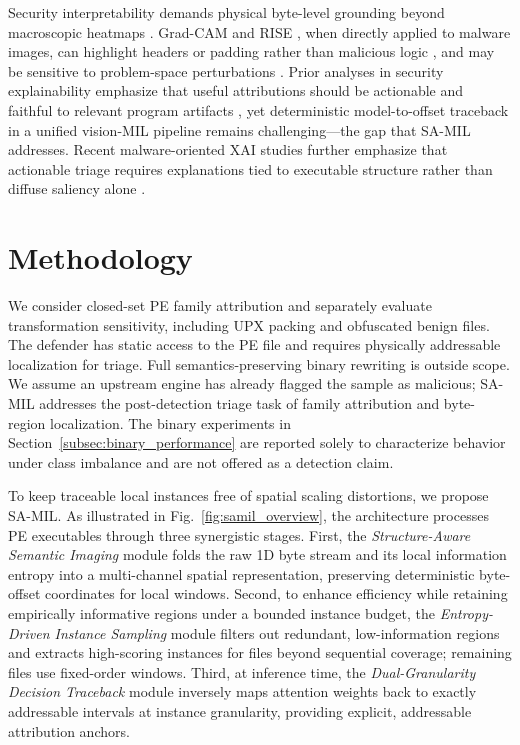 \documentclass[runningheads]{llncs}
\begin{document}
Security interpretability demands physical byte-level grounding beyond macroscopic heatmaps \cite{nadeem2023sok}. Grad-CAM \cite{selvaraju2017grad} and RISE \cite{petsiuk2018rise}, when directly applied to malware images, can highlight headers or padding rather than malicious logic \cite{warnecke2020evaluating}, and may be sensitive to problem-space perturbations \cite{pierazzi2020intriguing}. Prior analyses in security explainability emphasize that useful attributions should be actionable and faithful to relevant program artifacts \cite{nadeem2023sok,warnecke2020evaluating}, yet deterministic model-to-offset traceback in a unified vision-MIL pipeline remains challenging---the gap that SA-MIL addresses. Recent malware-oriented XAI studies further emphasize that actionable triage requires explanations tied to executable structure rather than diffuse saliency alone \cite{saqib2024comprehensive}.

\section{Methodology}
\label{sec:methodology}

We consider closed-set PE family attribution and separately evaluate transformation sensitivity, including UPX packing and obfuscated benign files. The defender has static access to the PE file and requires physically addressable localization for triage. Full semantics-preserving binary rewriting is outside scope. We assume an upstream engine has already flagged the sample as malicious; SA-MIL addresses the post-detection triage task of family attribution and byte-region localization. The binary experiments in Section~\ref{subsec:binary_performance} are reported solely to characterize behavior under class imbalance and are not offered as a detection claim.

To keep traceable local instances free of spatial scaling distortions, we propose SA-MIL. As illustrated in Fig.~\ref{fig:samil_overview}, the architecture processes PE executables through three synergistic stages. First, the \textit{Structure-Aware Semantic Imaging} module folds the raw 1D byte stream and its local information entropy into a multi-channel spatial representation, preserving deterministic byte-offset coordinates for local windows. Second, to enhance efficiency while retaining empirically informative regions under a bounded instance budget, the \textit{Entropy-Driven Instance Sampling} module filters out redundant, low-information regions and extracts high-scoring instances for files beyond sequential coverage; remaining files use fixed-order windows. Third, at inference time, the \textit{Dual-Granularity Decision Traceback} module inversely maps attention weights back to exactly addressable intervals at instance granularity, providing explicit, addressable attribution anchors.
\end{document}
